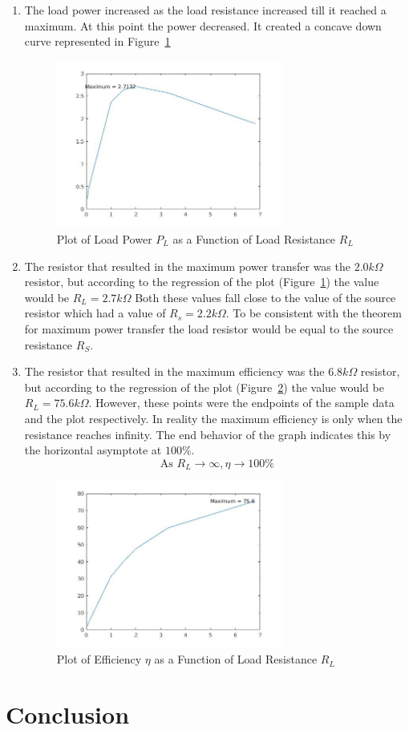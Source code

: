 \documentclass{article}
\begin{document}
\begin{enumerate}
  \item The load power increased as the load resistance increased till it reached a maximum.
  At this point the power decreased. It created a concave down curve represented in Figure~\ref{fig:loadpower}
    \begin{figure}[!ht]
  \centering
  \caption{Plot of Load Power $P_L$ as a Function of Load Resistance $R_L$\label{fig:loadpower}}
  \includegraphics[width=0.7\textwidth]{img/plotd.jpg}
  \end{figure}


  \item The resistor that resulted in the maximum power transfer was the $2.0 k\Omega$
    resistor, but according to the regression of the plot (Figure~\ref{fig:loadpower}) the value would be $R_L = 2.7 k\Omega$
    Both these values fall close to the value of the source resistor which
    had a value of $R_s = 2.2 k\Omega$. To be consistent with the theorem for maximum
    power transfer the load resistor would be equal to the source resistance $R_S$.
  \item The resistor that resulted in the maximum efficiency was the $6.8k \Omega$
  resistor, but according to the regression of the plot (Figure~\ref{fig:loadeff}) the value would
  be $R_L = 75.6 k\Omega$. However, these points were the endpoints of the sample data
   and the plot respectively. In reality the maximum efficiency is only when the resistance
   reaches infinity. The end behavior of the graph indicates this by the horizontal asymptote at $100\%$.
   \[\text{As } R_L \to \infty , \eta \to 100\% \]
     \begin{figure}[!ht]
  \centering
  \caption{Plot of Efficiency $\eta$ as a Function of Load Resistance $R_L$\label{fig:loadeff}}
  \includegraphics[width=0.7\textwidth]{img/plote.jpg}
  \end{figure}


\end{enumerate}
  \clearpage

  \section{Conclusion}
  \label{sec:Conclusion}
    \clearpage
\end{document}
